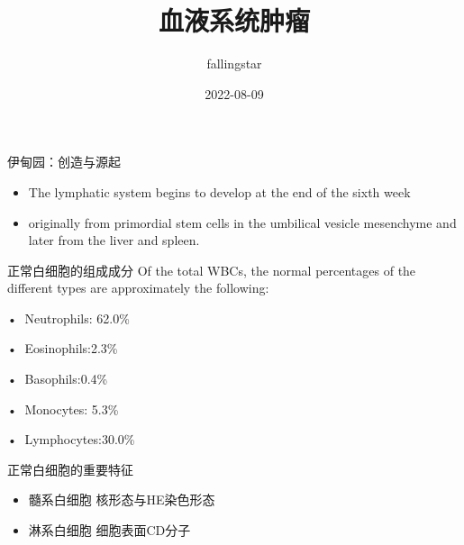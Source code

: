 \documentclass[
  ignorenonframetext,
]{beamer}
\title{血液系统肿瘤}
\author{fallingstar}
\date{2022-08-09}
\begin{document}
\frame{\titlepage}

\begin{frame}{伊甸园：创造与源起}
\protect\hypertarget{ux4f0aux7538ux56edux521bux9020ux4e0eux6e90ux8d77}{}
\begin{itemize}
\item
  The lymphatic system begins to develop at the end of the sixth week
\item
  originally from primordial stem cells in the umbilical vesicle
  mesenchyme and later from the liver and spleen.
\end{itemize}
\end{frame}

\begin{frame}
\begin{block}{正常白细胞的组成成分}
\protect\hypertarget{ux6b63ux5e38ux767dux7ec6ux80deux7684ux7ec4ux6210ux6210ux5206}{}
Of the total WBCs, the normal percentages of the different types are
approximately the following:

• Neutrophils: 62.0\%

• Eosinophils:2.3\%

• Basophils:0.4\%

• Monocytes: 5.3\%

• Lymphocytes:30.0\%
\end{block}
\end{frame}

\begin{frame}
\begin{block}{正常白细胞的重要特征}
\protect\hypertarget{ux6b63ux5e38ux767dux7ec6ux80deux7684ux91cdux8981ux7279ux5f81}{}
\begin{itemize}
\item
  髓系白细胞 核形态与HE染色形态
\item
  淋系白细胞 细胞表面CD分子
\end{itemize}
\end{block}
\end{frame}
\end{document}
